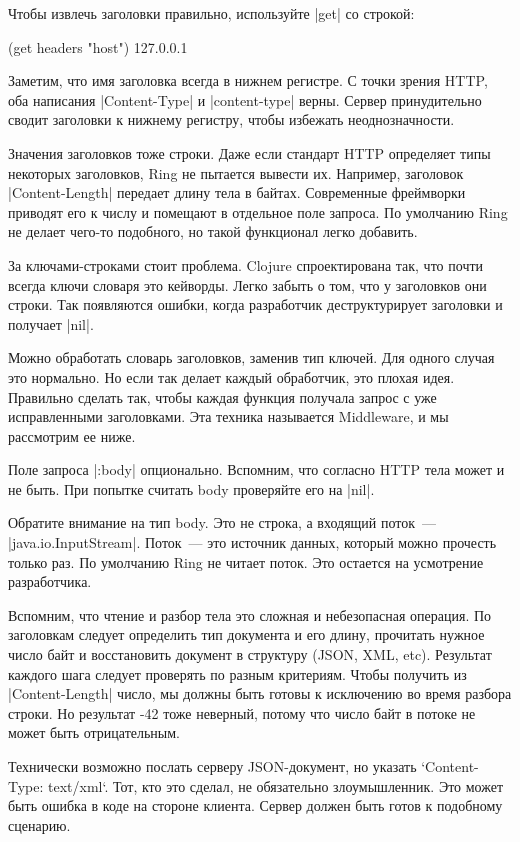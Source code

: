 Чтобы извлечь заголовки правильно, используйте \spverb|get| со строкой:

\begin{code}
(get headers "host")
127.0.0.1
\end{code}

Заметим, что имя заголовка всегда в нижнем регистре. С точки зрения HTTP, оба
написания \spverb|Content-Type| и \spverb|content-type| верны. Сервер принудительно сводит
заголовки к нижнему регистру, чтобы избежать неоднозначности.

Значения заголовков тоже строки. Даже если стандарт HTTP определяет типы
некоторых заголовков, Ring не пытается вывести их. Например, заголовок
\spverb|Content-Length| передает длину тела в байтах. Современные фреймворки приводят
его к числу и помещают в отдельное поле запроса. По умолчанию Ring не делает
чего-то подобного, но такой функционал легко добавить.

За ключами-строками стоит проблема. Clojure спроектирована так, что почти всегда
ключи словаря это кейворды. Легко забыть о том, что у заголовков они строки. Так
появляются ошибки, когда разработчик деструктурирует заголовки и получает \spverb|nil|.

Можно обработать словарь заголовков, заменив тип ключей. Для одного случая это
нормально. Но если так делает каждый обработчик, это плохая идея. Правильно
сделать так, чтобы каждая функция получала запрос с уже исправленными
заголовками. Эта техника называется Middleware, и мы рассмотрим ее ниже.

Поле запроса \spverb|:body| опционально. Вспомним, что согласно HTTP тела может и не
быть. При попытке считать body проверяйте его на \spverb|nil|.

Обратите внимание на тип body. Это не строка, а входящий поток~---
\spverb|java.io.InputStream|. Поток~--- это источник данных, который можно прочесть
только раз. По умолчанию Ring не читает поток. Это остается на усмотрение
разработчика.

Вспомним, что чтение и разбор тела это сложная и небезопасная операция. По
заголовкам следует определить тип документа и его длину, прочитать нужное число
байт и восстановить документ в структуру (JSON, XML, etc). Результат каждого
шага следует проверять по разным критериям. Чтобы получить из \spverb|Content-Length|
число, мы должны быть готовы к исключению во время разбора строки. Но результат
-42 тоже неверный, потому что число байт в потоке не может быть отрицательным.

Технически возможно послать серверу JSON-документ, но указать `Content-Type:
text/xml`. Тот, кто это сделал, не обязательно злоумышленник. Это может быть
ошибка в коде на стороне клиента. Сервер должен быть готов к подобному сценарию.

